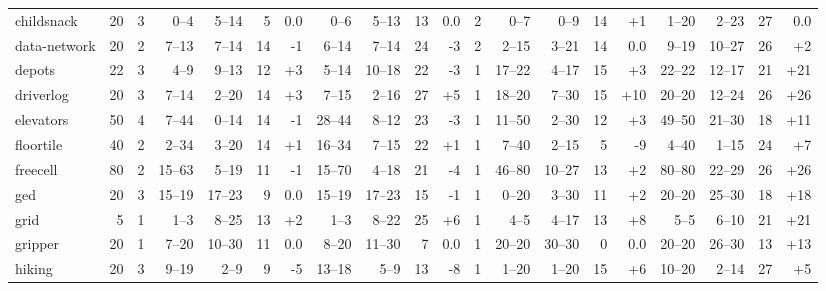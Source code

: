 \documentclass{article}
\begin{document}
\begin{table}
\begin{tabular}{l@{}rr|rrrr|rrrr|r|rrrr|rrrr}
   childsnack &    20 &   3 &    0--4 &  5--14 &   5 &              0.0 &    0--6 &  5--13 &  13 &               0.0 &   2 &     0--7 &   0--9 &  14 &  {\color{blue}+1} &    1--20 &  2--23 &  27 &               0.0 \\
 data-network &    20 &   2 &   7--13 &  7--14 &  14 &  {\color{red}-1} &   6--14 &  7--14 &  24 &   {\color{red}-3} &   2 &    2--15 &  3--21 &  14 &               0.0 &    9--19 & 10--27 &  26 &  {\color{blue}+2} \\
       depots &    22 &   3 &    4--9 &  9--13 &  12 & {\color{blue}+3} &   5--14 & 10--18 &  22 &   {\color{red}-3} &   1 &   17--22 &  4--17 &  15 &  {\color{blue}+3} &   22--22 & 12--17 &  21 & {\color{blue}+21} \\
    driverlog &    20 &   3 &   7--14 &  2--20 &  14 & {\color{blue}+3} &   7--15 &  2--16 &  27 &  {\color{blue}+5} &   1 &   18--20 &  7--30 &  15 & {\color{blue}+10} &   20--20 & 12--24 &  26 & {\color{blue}+26} \\
    elevators &    50 &   4 &   7--44 &  0--14 &  14 &  {\color{red}-1} &  28--44 &  8--12 &  23 &   {\color{red}-3} &   1 &   11--50 &  2--30 &  12 &  {\color{blue}+3} &   49--50 & 21--30 &  18 & {\color{blue}+11} \\
    floortile &    40 &   2 &   2--34 &  3--20 &  14 & {\color{blue}+1} &  16--34 &  7--15 &  22 &  {\color{blue}+1} &   1 &    7--40 &  2--15 &   5 &   {\color{red}-9} &    4--40 &  1--15 &  24 &  {\color{blue}+7} \\
     freecell &    80 &   2 &  15--63 &  5--19 &  11 &  {\color{red}-1} &  15--70 &  4--18 &  21 &   {\color{red}-4} &   1 &   46--80 & 10--27 &  13 &  {\color{blue}+2} &   80--80 & 22--29 &  26 & {\color{blue}+26} \\
          ged &    20 &   3 &  15--19 & 17--23 &   9 &              0.0 &  15--19 & 17--23 &  15 &   {\color{red}-1} &   1 &    0--20 &  3--30 &  11 &  {\color{blue}+2} &   20--20 & 25--30 &  18 & {\color{blue}+18} \\
         grid &     5 &   1 &    1--3 &  8--25 &  13 & {\color{blue}+2} &    1--3 &  8--22 &  25 &  {\color{blue}+6} &   1 &     4--5 &  4--17 &  13 &  {\color{blue}+8} &     5--5 &  6--10 &  21 & {\color{blue}+21} \\
      gripper &    20 &   1 &   7--20 & 10--30 &  11 &              0.0 &   8--20 & 11--30 &   7 &               0.0 &   1 &   20--20 & 30--30 &   0 &               0.0 &   20--20 & 26--30 &  13 & {\color{blue}+13} \\
       hiking &    20 &   3 &   9--19 &   2--9 &   9 &  {\color{red}-5} &  13--18 &   5--9 &  13 &   {\color{red}-8} &   1 &    1--20 &  1--20 &  15 &  {\color{blue}+6} &   10--20 &  2--14 &  27 &  {\color{blue}+5} \\

\end{tabular}
\end{table}
\end{document}
